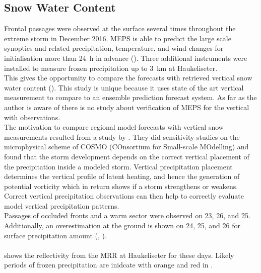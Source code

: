 \subsection{Snow Water Content}
\label{sec:res:large_scale_vert}
Frontal passages were observed at the surface several times throughout the extreme storm in December 2016. MEPS is able to predict the large scale synoptics and related precipitation, temperature, and wind changes for initialisation more than \SI{24}{\hour} in advance (). Three additional instruments were installed %
to measure frozen precipitation up to \SI{3}{\km} at Haukeliseter. 
\\
This %
gives the opportunity to compare the forecasts %
with retrieved vertical snow water content ().
This study is unique because it uses state of the art vertical measurement to compare to an ensemble prediction forecast system. As far as the author is aware of there is no study about verification of MEPS for the vertical %
with observations.
\\
The motivation to compare regional model forecasts with vertical snow measurements resulted from a study by \citet{joos_influence_2012}. They did sensitivity studies on the microphysical scheme of COSMO (COnsortium for Small-scale MOdelling) and found that the storm development depends on the correct vertical placement of the precipitation inside a modeled storm. Vertical precipitation placement determines the vertical profile of latent heating, and hence the generation of potential vorticity which in return shows if a storm strengthens or weakens. Correct vertical precipitation observations can then help to correctly evaluate model vertical precipitation patterns.
\\
Passages of occluded fronts and a warm sector were observed on \num{23}, \num{26}, and \SI{25}{\dec}. Additionally, an overestimation at the ground is shown on  \num{24}, \num{25}, and \SI{26}{\dec} for surface precipitation amount (, ). 
\\
\\
 shows the reflectivity from the MRR at Haukeliseter for these days. Likely periods of frozen precipitation are inidcate with orange and red in .%
